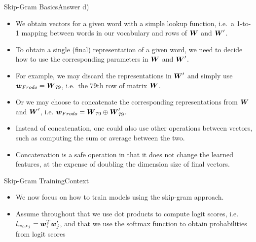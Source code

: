 \documentclass[t]{beamer}
\begin{document}
\begin{frame}{Skip-Gram Basics}{Answer d)}
    \begin{itemize}
        \item We obtain vectors for a given word with a simple lookup function,
              i.e.\ a 1-to-1 mapping between words in our vocabulary and rows of
              ${\boldsymbol{W}}$ and ${\boldsymbol{W}}'$.
        \item To obtain a single (final) representation of a given word, we need
              to decide how to use the corresponding parameters in ${\boldsymbol{W}}$ and
              ${\boldsymbol{W}}'$.
        \item For example, we may discard the representations in ${\boldsymbol{W}}'$ and
              simply use ${\boldsymbol{w}}_{Frodo} = {\boldsymbol{W}}_{79}$, i.e.\ the 79th row of matrix
              ${\boldsymbol{W}}$.
        \item Or we may choose to concatenate the corresponding representations
              from ${\boldsymbol{W}}$ and ${\boldsymbol{W}}'$, i.e.
              ${\boldsymbol{w}}_{Frodo} = {\boldsymbol{W}}_{79}\oplus{\boldsymbol{W}}'_{79}$.
        \item Instead of concatenation, one could also use other operations
              between vectors, such as computing the sum or average between the
              two.
        \item Concatenation is a safe operation in that it does not change the
              learned features, at the expense of doubling the dimension size of
              final vectors.
    \end{itemize}
\end{frame}

\begin{frame}{Skip-Gram Training}{Context}
    \begin{itemize}
        \item We now focus on how to train models using the skip-gram approach.
        \item  Assume throughout that we use dot products to compute logit
              scores, i.e. $l_{w_i,c_j} = {\boldsymbol{w}}_i^T{\boldsymbol{w}}'_j$, and that we use the
              softmax function to obtain probabilities from logit scores
    \end{itemize}
\end{frame}
\end{document}
